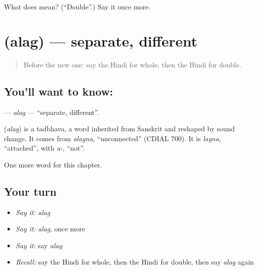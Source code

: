 \begin{tcolorbox}[breakable,colback=teal!4,colframe=teal!35!black,title={Before you move on}]
What does  mean? (\textquotedblleft{}Double\textquotedblright{}.) Say it once more.
\end{tcolorbox}
\section[\texorpdfstring{\hi{अलग} (alag)}{अलग (alag)}]{ (alag) — separate, different}

\label{lesson:HI-C236-alag}



\begin{quote}
Before the new one: say the Hindi for whole, then the Hindi for double.
\end{quote}

\subsection*{You'll want to know: }
\textbf{} — \emph{alag} — \textquotedblleft{}separate, different\textquotedblright{}.

\begin{cousinweb}
\textbf{} (\emph{alag}) is a tadbhava, a word inherited from Sanskrit and reshaped by sound change. It comes from \emph{alagna}, \textquotedblleft{}unconnected\textquotedblright{} (CDIAL 700). It is \emph{lagna}, \textquotedblleft{}attached\textquotedblright{}, with \emph{a-}, \textquotedblleft{}not\textquotedblright{}.
\end{cousinweb}

\begin{grammarlens}[title={What you've built}]
One more word for this chapter.
\end{grammarlens}

\subsection*{Your turn}
\begin{itemize}
\raggedright
  \item \emph{Say it:} \emph{alag}
  \item \emph{Say it:} \emph{alag}, once more
  \item \emph{Say it:} say \emph{alag}
  \item \emph{Recall:} say the Hindi for whole, then the Hindi for double, then say \emph{alag} again
\end{itemize}

